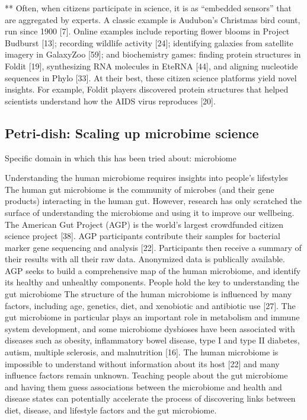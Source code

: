 **
Often, when citizens participate in science, it is as “embedded sensors” that are aggregated by experts. A classic example is Audubon’s Christmas bird count, run since 1900
[7]. Online examples include reporting flower blooms in
Project Budburst [13]; recording wildlife activity [24];
identifying galaxies from satellite imagery in GalaxyZoo
[59]; and biochemistry games: finding protein structures in
Foldit [19], synthesizing RNA molecules in EteRNA [44], and aligning nucleotide sequences in Phylo [33]. At their
best, these citizen science platforms yield novel insights.
For example, Foldit players discovered protein structures
that helped scientists understand how the AIDS virus reproduces [20].


\subsection{Petri-dish: Scaling up microbime science}
Specific domain in which this has been tried about: microbiome

Understanding the human microbiome requires insights
into people’s lifestyles
The human gut microbiome is the community of microbes
(and their gene products) interacting in the human gut.
However, research has only scratched the surface of understanding the microbiome and using it to improve our wellbeing. The American Gut Project (AGP) is the world's
largest crowdfunded citizen science project [38]. AGP
participants contribute their samples for bacterial marker
gene sequencing and analysis [22]. Participants then receive
a summary of their results with all their raw data. Anonymized data is publically available. AGP seeks to build a
comprehensive map of the human microbiome, and identify
its healthy and unhealthy components.
People hold the key to understanding the gut microbiome
The structure of the human microbiome is influenced by
many factors, including age, genetics, diet, and xenobiotic
and antibiotic use [27]. The gut microbiome in particular
plays an important role in metabolism and immune system
development, and some microbiome dysbioses have been
associated with diseases such as obesity, inflammatory
bowel disease, type I and type II diabetes, autism, multiple
sclerosis, and malnutrition [16]. The human microbiome is
impossible to understand without information about its host
[22] and many influence factors remain unknown. Teaching
people about the gut microbiome and having them guess
associations between the microbiome and health and disease states can potentially accelerate the process of discovering links between diet, disease, and lifestyle factors and
the gut microbiome.






